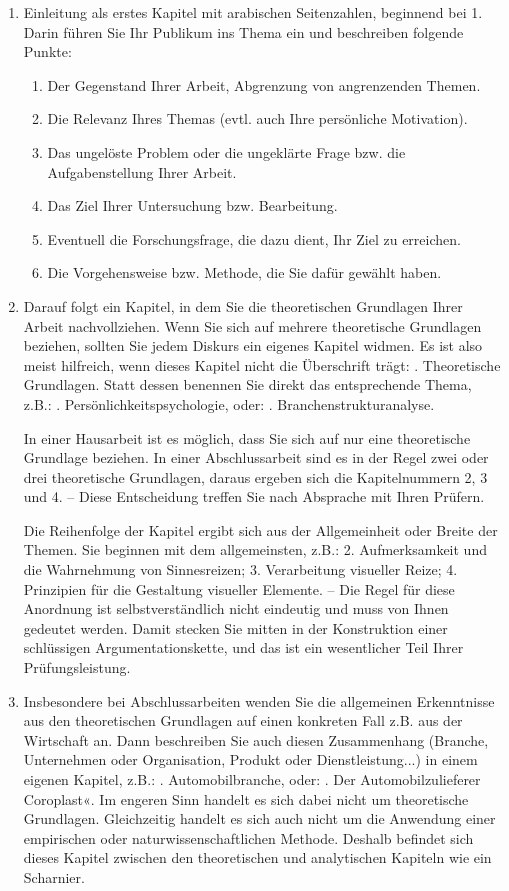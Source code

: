 \begin{enumerate}
\item Einleitung als erstes Kapitel mit arabischen Seitenzahlen, beginnend bei 1. Darin führen Sie Ihr Publikum ins Thema ein und beschreiben folgende Punkte:
  \begin{enumerate}[label*=\arabic*.]
  \item Der Gegenstand Ihrer Arbeit, Abgrenzung von angrenzenden Themen.
  \item Die Relevanz Ihres Themas (evtl. auch Ihre persönliche Motivation).
  \item Das ungelöste Problem oder die ungeklärte Frage bzw. die Aufgabenstellung Ihrer Arbeit.
  \item Das Ziel Ihrer Untersuchung bzw. Bearbeitung.
  \item Eventuell die Forschungsfrage, die dazu dient, Ihr Ziel zu erreichen.
  \item Die Vorgehensweise bzw. Methode, die Sie dafür gewählt haben.
  \end{enumerate}

\item Darauf folgt ein Kapitel, in dem Sie die theoretischen Grundlagen Ihrer Arbeit nachvollziehen. Wenn Sie sich auf mehrere theoretische Grundlagen beziehen, sollten Sie jedem Diskurs ein eigenes Kapitel widmen. Es ist also meist hilfreich, wenn dieses Kapitel nicht die Überschrift trägt: . Theoretische Grundlagen\grqq{}. Statt dessen benennen Sie direkt das entsprechende Thema, z.B.: . Persönlichkeitspsychologie\grqq{}, oder: . Branchenstrukturanalyse\grqq{}.

In einer Hausarbeit ist es möglich, dass Sie sich auf nur eine theoretische Grundlage beziehen. In einer Abschlussarbeit sind es in der Regel zwei oder drei theoretische Grundlagen, daraus ergeben sich die Kapitelnummern 2, 3 und 4. – Diese Entscheidung treffen Sie nach Absprache mit Ihren Prüfern.

Die Reihenfolge der Kapitel ergibt sich aus der Allgemeinheit oder Breite der Themen. Sie beginnen mit dem allgemeinsten, z.B.: 2. Aufmerksamkeit und die Wahrnehmung von Sinnesreizen; 3. Verarbeitung visueller Reize; 4. Prinzipien für die Gestaltung visueller Elemente. – Die Regel für diese Anordnung ist selbstverständlich nicht eindeutig und muss von Ihnen gedeutet werden. Damit stecken Sie mitten in der Konstruktion einer schlüssigen Argumentationskette, und das ist ein wesentlicher Teil Ihrer Prüfungsleistung.

\item Insbesondere bei Abschlussarbeiten wenden Sie die allgemeinen Erkenntnisse aus den theoretischen Grundlagen auf einen konkreten Fall z.B. aus der Wirtschaft an. Dann beschreiben Sie auch diesen Zusammenhang (Branche, Unternehmen oder Organisation, Produkt oder Dienstleistung...) in einem eigenen Kapitel, z.B.: . Automobilbranche\grqq{}, oder: . Der Automobilzulieferer Coroplast«. Im engeren Sinn handelt es sich dabei nicht um theoretische Grundlagen. Gleichzeitig handelt es sich auch nicht um die Anwendung einer empirischen oder naturwissenschaftlichen Methode. Deshalb befindet sich dieses Kapitel zwischen den theoretischen und analytischen Kapiteln wie ein Scharnier.


\end{enumerate}
